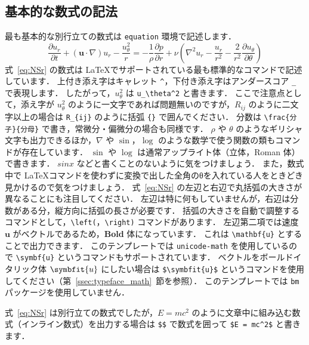 \subsection{基本的な数式の記法}
\label{ssec:basic_command}

最も基本的な別行立ての数式は \verb|equation| 環境で記述します．
\begin{equation}
    \frac{\partial u_r}{\partial t} + (\mathbf{u}\cdot\nabla)u_r - \frac{u_\theta^2}{r} = -\frac{1}{\rho}\frac{\partial p}{\partial r} + \nu\left(\nabla^2 u_r - \frac{u_r}{r^2} - \frac{2}{r^2}\frac{\partial u_\theta}{\partial \theta}\right)
    \label{eq:NSr}
\end{equation}
式~\eqref{eq:NSr} の数式は \LaTeX でサポートされている最も標準的なコマンドで記述しています．
上付き添え字はキャレット \verb|^|，下付き添え字はアンダースコア \verb|_| で表現します．
したがって，$u_\theta^2$ は \verb|u_\theta^2| と書きます．
ここで注意点として，添え字が $u_\theta^2$ のように一文字であれば問題無いのですが，$R_{ij}$ のように二文字以上の場合は \verb|R_{ij}| のように括弧 \verb|{}| で囲んでください．
分数は \verb|\frac{分子}{分母}| で書き，常微分・偏微分の場合も同様です．
$\rho$ や $\theta$ のようなギリシャ文字も出力できるほか，$\nabla$ や $\sin$，$\log$ のような数学で使う関数の類もコマンドが存在しています．
$\sin$ や $\log$ は通常アップライト体（立体，Roman 体）で書きます．
$sin x$ などと書くことのないように気をつけましょう．
また，数式中で \LaTeX コマンドを使わずに変換で出した全角のθを入れている人をときどき見かけるので気をつけましょう．
式~\eqref{eq:NSr} の左辺と右辺で丸括弧の大きさが異なることにも注目してください．
左辺は特に何もしていませんが，右辺は分数がある分，縦方向に括弧の長さが必要です．
括弧の大きさを自動で調整するコマンドとして，\verb|\left(|，\verb|\right)| コマンドがあります．
左辺第二項では速度 $\mathbf{u}$ がベクトルであるため，\textbf{Bold} 体になっています．
これは \verb|\mathbf{u}| とすることで出力できます．
このテンプレートでは \verb|unicode-math| を使用しているので \verb|\symbf{u}| というコマンドもサポートされています．
ベクトルをボールドイタリック体 $\symbfit{u}$ にしたい場合は \verb|$\symbfit{u}$| というコマンドを使用してください（第~\ref{ssec:typeface_math}~節を参照）．
このテンプレートでは \verb|bm| パッケージを使用していません．

式~\eqref{eq:NSr} は別行立ての数式でしたが，$E = mc^2$ のように文章中に組み込む数式（インライン数式）を出力する場合は \verb|$$| で数式を囲って \verb|$E = mc^2$| と書きます．

